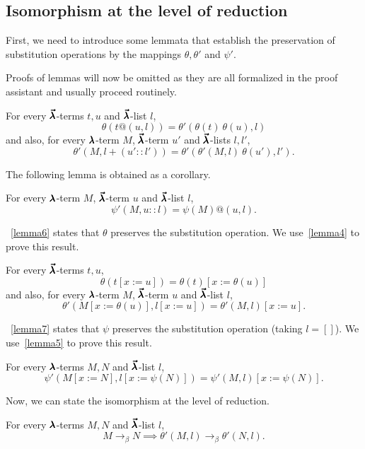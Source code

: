 \subsection{Isomorphism at the level of reduction}

First, we need to introduce some lemmata that establish the preservation of substitution operations by the mappings $\theta, \theta'$ and $\psi'$.

Proofs of lemmas will now be omitted as they are all formalized in the proof assistant and usually proceed routinely.

\begin{lemma}
  \label{lemma4}
  For every $\pmb{\vec \lambda}$-terms $t, u$ and $\pmb{\vec \lambda}$-list $l$,
  \[ \theta(t@(u, l)) = \theta'(\theta(t) \ \theta(u), l) \]
  and also, for every $\pmb{\lambda}$-term $M$, $\pmb{\vec \lambda}$-term $u'$ and $\pmb{\vec \lambda}$-lists $l, l'$,
  \[ \theta'(M, l+(u'::l')) = \theta'(\theta'(M, l) \ \theta(u'), l'). \]
\end{lemma}

The following lemma is obtained as a corollary.

\begin{lemma}
  \label{lemma5}
  For every $\pmb{\lambda}$-term $M$, $\pmb{\vec \lambda}$-term $u$ and $\pmb{\vec \lambda}$-list $l$,
  \[ \psi'(M, u :: l) = \psi(M)@(u, l). \]
\end{lemma}

~\cref{lemma6} states that $\theta$ preserves the substitution operation.
We use~\cref{lemma4} to prove this result.

\begin{lemma}
  \label{lemma6}
  For every $\pmb{\vec \lambda}$-terms $t, u$,
  \[ \theta(t[x := u]) = \theta(t)[x := \theta(u)] \]
  and also, for every $\pmb{\lambda}$-term $M$,  $\pmb{\vec \lambda}$-term $u$ and $\pmb{\vec \lambda}$-list $l$,
  \[ \theta'(M[x := \theta(u)], l[x := u]) = \theta'(M, l)[x := u]. \]
\end{lemma}

~\cref{lemma7} states that $\psi$ preserves the substitution operation (taking $l = []$).
We use~\cref{lemma5} to prove this result.

\begin{lemma}
  \label{lemma7}
  For every $\pmb{\lambda}$-terms $M, N$ and $\pmb{\vec \lambda}$-list $l$,
  \[ \psi'(M[x := N], l[x := \psi(N)]) = \psi'(M, l)[x := \psi(N)]. \]
\end{lemma}

Now, we can state the isomorphism at the level of reduction.

\begin{lemma}
  \label{lemma8}
  For every $\pmb{\lambda}$-terms $M, N$ and $\pmb{\vec \lambda}$-list $l$,
  \[ M \to_{\beta} N \implies \theta'(M, l) \to_{\beta} \theta'(N, l). \]
\end{lemma}

